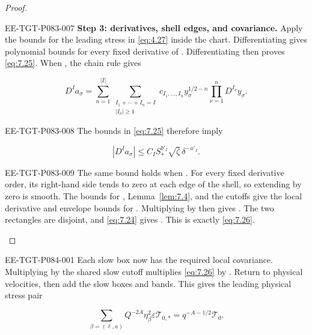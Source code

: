 \begin{proof}
\begin{EESegment}{EE-TGT-P083-007}
\textbf{Step 3: derivatives, shell edges, and covariance.}
Apply the bounds for the leading stress in \eqref{eq:4.27} inside the chart. Differentiating  gives polynomial bounds for every fixed derivative of . Differentiating  then proves \eqref{eq:7.25}. When , the chain rule gives
\end{EESegment}
\[
  D^Ia_\sigma=
  \sum_{n=1}^{|I|}
  \sum_{\substack{I_1+\cdots+I_n=I\\|I_\nu|\geq1}}
  c_{I_1,\ldots,I_n}y_\sigma^{1/2-n}
  \prod_{\nu=1}^nD^{I_\nu}y_\sigma.
\]
\begin{EESegment}{EE-TGT-P083-008}
The bounds in \eqref{eq:7.25} therefore imply
\end{EESegment}
\[
  |D^Ia_\sigma|\leq C_IS_*^{b'_I}\sqrt{\zeta}\,\delta^{-a'_I}.
\]
\begin{EESegment}{EE-TGT-P083-009}
The same bound holds when . For every fixed derivative order, its right-hand side tends to zero at each edge of the shell, so extending  by zero is smooth. The bounds for , Lemma~\ref{lem:7.4}, and the cutoffs  give the local derivative and envelope bounds for . Multiplying by  then gives . The two rectangles are disjoint, and \eqref{eq:7.24} gives . This is exactly \eqref{eq:7.26}.
\end{EESegment}
\end{proof}
%
\begin{EESegment}{EE-TGT-P084-001}
Each slow box now has the required local covariance. Multiplying by the shared slow cutoff  multiplies \eqref{eq:7.26} by . Return to physical velocities, then add the slow boxes and bands. This gives the leading physical stress pair
\end{EESegment}
\begin{equation}
  \sum_{\beta=(\ell,a)}Q^{-2A}\eta_\beta^2\varepsilon\mathcal T_{0,*}
  =q^{-A-1/2}\mathcal T_0.
  \tag{7.30}\label{eq:7.30}
\end{equation}
